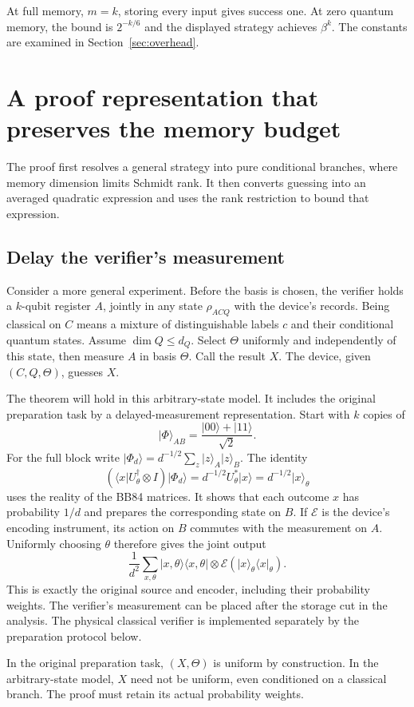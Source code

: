 \documentclass[11pt,a4paper]{article}
\newcommand{\ket}[1]{\lvert #1\rangle}
\newcommand{\bra}[1]{\langle #1\rvert}
\newcommand{\newsection}[1]{\section{#1}}
\begin{document}
At full memory, $m=k$, storing every input gives success one. At zero quantum memory, the bound is $2^{-k/6}$ and the displayed strategy achieves $\beta^k$. The constants are examined in Section~\ref{sec:overhead}.

\newsection{A proof representation that preserves the memory budget}
The proof first resolves a general strategy into pure conditional branches, where memory dimension limits Schmidt rank. It then converts guessing into an averaged quadratic expression and uses the rank restriction to bound that expression.
\subsection{Delay the verifier's measurement}
Consider a more general experiment. Before the basis is chosen, the verifier holds a $k$-qubit register $A$, jointly in any state $\rho_{ACQ}$ with the device's records. Being classical on $C$ means a mixture of distinguishable labels $c$ and their conditional quantum states. Assume $\dim Q\leq d_Q$. Select $\Theta$ uniformly and independently of this state, then measure $A$ in basis $\Theta$. Call the result $X$. The device, given $(C,Q,\Theta)$, guesses $X$.

The theorem will hold in this arbitrary-state model. It includes the original preparation task by a delayed-measurement representation. Start with $k$ copies of
\[
\ket\Phi_{AB}=\frac{\ket{00}+\ket{11}}{\sqrt2}.
\]
For the full block write $\ket{\Phi_d}=d^{-1/2}\sum_z\ket z_A\ket z_B$. The identity
\[
(\bra xU_\theta^\dagger\otimes I)\ket{\Phi_d}
=d^{-1/2}U_\theta^*\ket x
=d^{-1/2}\ket x_\theta
\]
uses the reality of the BB84 matrices. It shows that each outcome $x$ has probability $1/d$ and prepares the corresponding state on $B$. If $\mathcal E$ is the device's encoding instrument, its action on $B$ commutes with the measurement on $A$. Uniformly choosing $\theta$ therefore gives the joint output
\[
\frac1{d^2}\sum_{x,\theta}\ket{x,\theta}\bra{x,\theta}
\otimes\mathcal E(\ket x_\theta\bra x_\theta).
\]
This is exactly the original source and encoder, including their probability weights. The verifier's measurement can be placed after the storage cut in the analysis. The physical classical verifier is implemented separately by the preparation protocol below.

In the original preparation task, $(X,\Theta)$ is uniform by construction. In the arbitrary-state model, $X$ need not be uniform, even conditioned on a classical branch. The proof must retain its actual probability weights.
\end{document}
